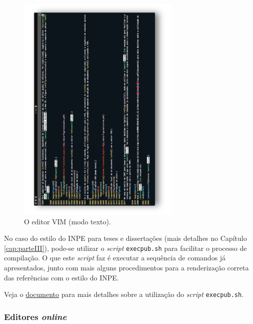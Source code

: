 \begin{figure}[H]
\caption{O editor VIM (modo texto).}
\vspace{6mm}
  \begin{center}
    \includegraphics[width=0.7\textwidth,angle=-90]{./docs/figs/editorvim.pdf}
  \end{center}
\vspace{4mm}
\label{fig:editorvim}
\end{figure}

No caso do estilo do INPE para teses e dissertações (mais detalhes no Capítulo \ref{cap:parteIII}), pode-se utilizar o \textit{script} {\tt execpub.sh} para facilitar o processo de compilação. O que este \textit{script} faz é executar a sequência de comandos já apresentados, junto com mais alguns procedimentos para a renderização correta das referências com o estilo do INPE. 

\begin{marker}
Veja o \href{http://mtc-m16d.sid.inpe.br/col/sid.inpe.br/mtc-m19@80/2010/03.24.15.12/doc/ambiente_latex_no_linux.pdf}{documento} para mais detalhes sobre a utilização do \textit{script} {\tt execpub.sh}.
\end{marker}

\subsubsection*{Editores \textit{online}}
\label{sec:ed_online}

